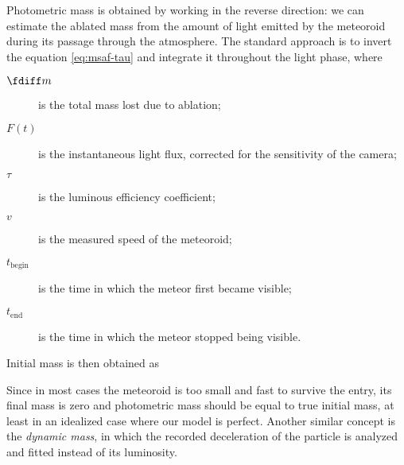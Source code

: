             Photometric mass is obtained by working in the reverse direction: we can estimate the
            ablated mass from the amount of light emitted by the meteoroid during its passage through the atmosphere.
            The standard approach is to invert the equation \cref{eq:msaf-tau} and integrate it
            throughout the light phase,
            where
            \begin{description}
                \item[$\fdiff m$]
                    is the total mass lost due to ablation;
                \item[$F(t)$]
                    is the instantaneous light flux, corrected for the sensitivity of the camera;
                \item[$\tau$]
                    is the luminous efficiency coefficient;
                \item[$v$]
                    is the measured speed of the meteoroid;
                \item[$t_\mathrm{begin}$]
                    is the time in which the meteor first became visible;
                \item[$t_\mathrm{end}$]
                    is the time in which the meteor stopped being visible.
            \end{description}

            Initial mass is then obtained as

            Since in most cases the meteoroid is too small and fast to survive the entry, its final mass is zero
            and photometric mass should be equal to true initial mass, at least in an idealized case where our model is perfect.
            Another similar concept is the \emph{dynamic mass}, in which the recorded deceleration of the particle
            is analyzed and fitted instead of its luminosity.



